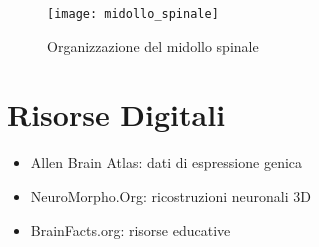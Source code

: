 \documentclass[12pt]{article}
\begin{document}
\begin{figure}[h]
    \centering
    \texttt{[image: midollo\_spinale]}
    \caption{Organizzazione del midollo spinale}
\end{figure}

\section{Risorse Digitali}
\begin{itemize}
    \item Allen Brain Atlas: dati di espressione genica
    \item NeuroMorpho.Org: ricostruzioni neuronali 3D
    \item BrainFacts.org: risorse educative
\end{itemize}
\end{document}
